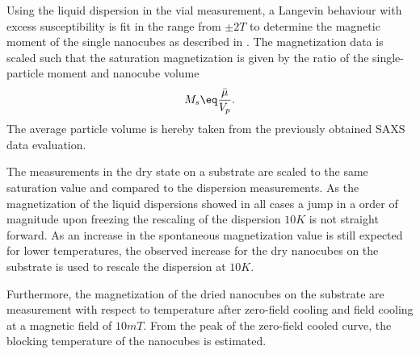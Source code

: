 \documentclass[\main/dresen_thesis.tex]{subfiles}
\begin{document}
    Using the liquid dispersion in the vial measurement, a Langevin behaviour with excess susceptibility is fit in the range from $\pm 2 \unit{T}$ to determine the magnetic moment of the single nanocubes as described in .
    The magnetization data is scaled such that the saturation magnetization is given by the ratio of the single-particle moment and nanocube volume
    \begin{align}
      M_s \eq \frac{\bar{\mu}}{V_p}.
    \end{align}
    The average particle volume is hereby taken from the previously obtained SAXS data evaluation.

    The measurements in the dry state on a substrate are scaled to the same saturation value and compared to the dispersion measurements.
    As the magnetization of the liquid dispersions showed in all cases a jump in a order of magnitude upon freezing the rescaling of the dispersion $10 \unit{K}$ is not straight forward.
    As an increase in the spontaneous magnetization value is still expected for lower temperatures, the observed increase for the dry nanocubes on the substrate is used to rescale the dispersion at $10 \unit{K}$.

    Furthermore, the magnetization of the dried nanocubes on the substrate are measurement with respect to temperature after zero-field cooling and field cooling at a magnetic field of $10 \unit{mT}$.
    From the peak of the zero-field cooled curve, the blocking temperature of the nanocubes is estimated.
\end{document}
